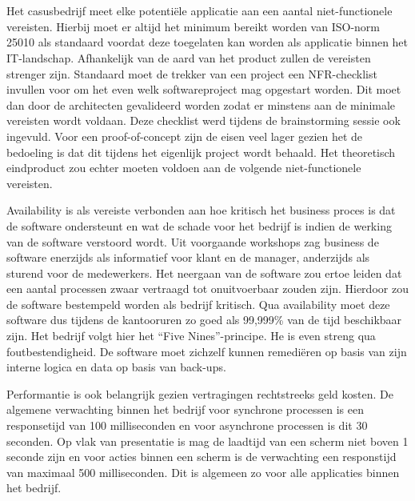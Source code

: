 \section{}%
\label{sec:niet-functionele vereisten}
\subsection{}%
\label{subsec:overlopen nfr-checklist met systeem architect}
Het casusbedrijf meet elke potentiële applicatie aan een aantal niet-functionele vereisten. Hierbij moet er altijd het minimum bereikt worden van ISO-norm 25010 als standaard voordat deze toegelaten kan worden als applicatie binnen het IT-landschap. Afhankelijk van de aard van het product zullen de vereisten strenger zijn. Standaard moet de trekker van een project een NFR-checklist invullen voor om het even welk softwareproject mag opgestart worden. Dit moet dan door de architecten gevalideerd worden zodat er minstens aan de minimale vereisten wordt voldaan. Deze checklist werd tijdens de brainstorming sessie ook ingevuld. Voor een proof-of-concept zijn de eisen veel lager gezien het de bedoeling is dat dit tijdens het eigenlijk project wordt behaald. Het theoretisch eindproduct zou echter moeten voldoen aan de volgende niet-functionele vereisten. \newline

Availability is als vereiste verbonden aan hoe kritisch het business proces is dat de software ondersteunt en wat de schade voor het bedrijf is indien de werking van de software verstoord wordt. Uit voorgaande workshops zag business de software enerzijds als informatief voor klant en de manager, anderzijds als sturend voor de medewerkers. Het neergaan van de software zou ertoe leiden dat een aantal processen zwaar vertraagd tot onuitvoerbaar zouden zijn. Hierdoor zou de software bestempeld worden als bedrijf kritisch. Qua availability moet deze software dus tijdens de kantooruren zo goed als 99,999\% van de tijd beschikbaar zijn. Het bedrijf volgt hier het “Five Nines”-principe. He is even streng qua foutbestendigheid. De software moet zichzelf kunnen remediëren op basis van zijn interne logica en data op basis van back-ups. \newline

Performantie is ook belangrijk gezien vertragingen rechtstreeks geld kosten. De algemene verwachting binnen het bedrijf voor synchrone processen is een responsetijd van 100 milliseconden en voor asynchrone processen is dit 30 seconden. Op vlak van presentatie is mag de laadtijd van een scherm niet boven 1 seconde zijn en voor acties binnen een scherm is de verwachting een responstijd van maximaal 500 milliseconden. Dit is algemeen zo voor alle applicaties binnen het bedrijf.\newline

